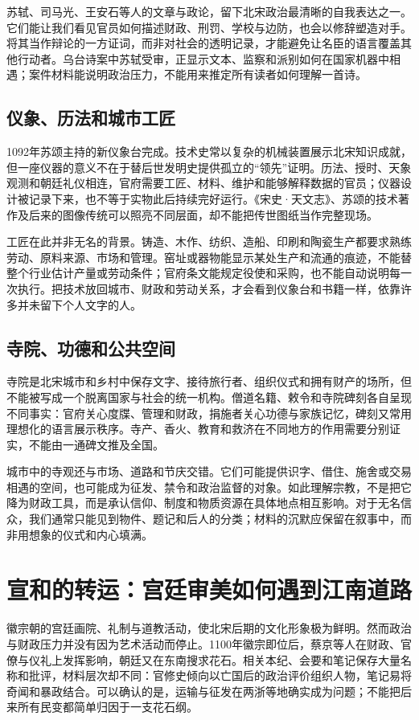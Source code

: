苏轼、司马光、王安石等人的文章与政论，留下北宋政治最清晰的自我表达之一。它们能让我们看见官员如何描述财政、刑罚、学校与边防，也会以修辞塑造对手。将其当作辩论的一方证词，而非对社会的透明记录，才能避免让名臣的语言覆盖其他行动者。乌台诗案中苏轼受审，正显示文本、监察和派别如何在国家机器中相遇；案件材料能说明政治压力，不能用来推定所有读者如何理解一首诗。

\subsection{仪象、历法和城市工匠}

1092年苏颂主持的新仪象台完成。技术史常以复杂的机械装置展示北宋知识成就，但一座仪器的意义不在于替后世发明史提供孤立的“领先”证明。历法、授时、天象观测和朝廷礼仪相连，官府需要工匠、材料、维护和能够解释数据的官员；仪器设计被记录下来，也不等于实物此后持续完好运行。《宋史·天文志》、苏颂的技术著作及后来的图像传统可以照亮不同层面，却不能把传世图纸当作完整现场。

工匠在此并非无名的背景。铸造、木作、纺织、造船、印刷和陶瓷生产都要求熟练劳动、原料来源、市场和管理。窑址或器物能显示某处生产和流通的痕迹，不能替整个行业估计产量或劳动条件；官府条文能规定役使和采购，也不能自动说明每一次执行。把技术放回城市、财政和劳动关系，才会看到仪象台和书籍一样，依靠许多并未留下个人文字的人。

\subsection{寺院、功德和公共空间}

寺院是北宋城市和乡村中保存文字、接待旅行者、组织仪式和拥有财产的场所，但不能被写成一个脱离国家与社会的统一机构。僧道名籍、敕令和寺院碑刻各自呈现不同事实：官府关心度牒、管理和财政，捐施者关心功德与家族记忆，碑刻又常用理想化的语言展示秩序。寺产、香火、教育和救济在不同地方的作用需要分别证实，不能由一通碑文推及全国。

城市中的寺观还与市场、道路和节庆交错。它们可能提供识字、借住、施舍或交易相遇的空间，也可能成为征发、禁令和政治监督的对象。如此理解宗教，不是把它降为财政工具，而是承认信仰、制度和物质资源在具体地点相互影响。对于无名信众，我们通常只能见到物件、题记和后人的分类；材料的沉默应保留在叙事中，而非用想象的仪式和内心填满。

\section{宣和的转运：宫廷审美如何遇到江南道路}

徽宗朝的宫廷画院、礼制与道教活动，使北宋后期的文化形象极为鲜明。然而政治与财政压力并没有因为艺术活动而停止。1100年徽宗即位后，蔡京等人在财政、官僚与仪礼上发挥影响，朝廷又在东南搜求花石。相关本纪、会要和笔记保存大量名称和批评，材料层次却不同：官修史倾向以亡国后的政治评价组织人物，笔记易将奇闻和暴政结合。可以确认的是，运输与征发在两浙等地确实成为问题；不能把后来所有民变都简单归因于一支花石纲。

